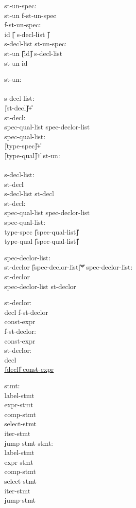 \begin{center}
\PAIR 
{
st-un-spec: \\
\>	st-un f-st-un-spec \\
f-st-un-spec: \\
\>	id \U{[}\T{\{} s-decl-list \T{\}}\U{]}  \\
\>	\T{\{} s-decl-list \T{\}} 
}
{
st-un-spec: \\
\> 	st-un \U{[}id\U{]} \T{\{} s-decl-list \T{\}}\\
\>	st-un id
}

\PAIR
{
st-un: \\
\>	   \\
s-decl-list: \\
\>	\U{[}st-decl\U{]}\U{+} \\
st-decl: \\
\>	spec-qual-list spec-declor-list \T{;} \\
spec-qual-list: \\
\>	\U{[}type-spec\U{]}\U{+}\\
\>      \U{[}type-qual\U{]}\U{+}
}
{
st-un: \\
\>	  \\
s-decl-list: \\
\>	st-decl \\
\>	s-decl-list st-decl \\
st-decl: \\
\>	spec-qual-list spec-declor-list \T{;} \\
spec-qual-list: \\
\>	type-spec \U{[}spec-qual-list\U{]}\\ 
\>      type-qual \U{[}spec-qual-list\U{]}
}

\PAIR
{
spec-declor-list: \\
\>	st-declor \U{[}\T{,}spec-declor-list\U{]}\U{*} 
}
{
spec-declor-list: \\
\>	st-declor \\
\>	spec-declor-list \T{,} st-declor 
}

\PAIR
{
st-declor: \\
\>	decl f-st-declor \\
\>	\T{:} const-expr \\
f-st-declor: \\
\>	\T{:} const-expr \\
\>	 
}
{
st-declor: \\
\>	decl \\
\>	\underline{\U{[}decl\U{]} \T{:} const-expr }
}

\PAIR
{
stmt:\\
\>	label-stmt\\
\>	expr-stmt\\
\>	comp-stmt\\
\>	select-stmt\\
\>	iter-stmt\\
\>	jump-stmt
}
{
stmt:\\
\>	label-stmt\\
\>	expr-stmt\\
\>	comp-stmt\\
\>	select-stmt\\
\>	iter-stmt\\
\>	jump-stmt
}


\end{center}
